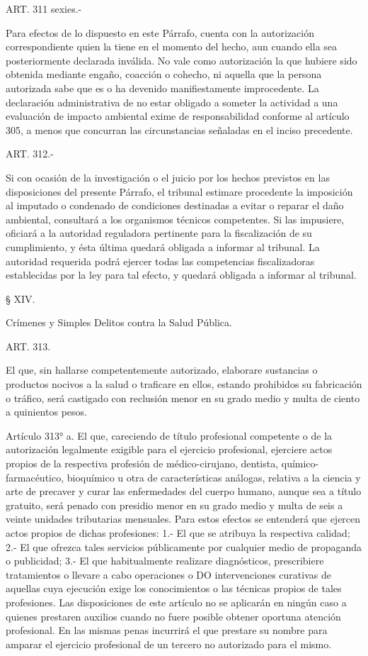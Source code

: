     ART. 311 sexies.-

    Para efectos de lo dispuesto en este Párrafo, cuenta con la autorización correspondiente quien la tiene en el momento del hecho, aun cuando ella sea posteriormente declarada inválida.
    No vale como autorización la que hubiere sido obtenida mediante engaño, coacción o cohecho, ni aquella que la persona autorizada sabe que es o ha devenido manifiestamente improcedente.
    La declaración administrativa de no estar obligado a someter la actividad a una evaluación de impacto ambiental exime de responsabilidad conforme al artículo 305, a menos que concurran las circunstancias señaladas en el inciso precedente.


    ART. 312.-

    Si con ocasión de la investigación o el juicio por los hechos previstos en las disposiciones del presente Párrafo, el tribunal estimare procedente la imposición al imputado o condenado de condiciones destinadas a evitar o reparar el daño ambiental, consultará a los organismos técnicos competentes. Si las impusiere, oficiará a la autoridad reguladora pertinente para la fiscalización de su cumplimiento, y ésta última quedará obligada a informar al tribunal. La autoridad requerida podrá ejercer todas las competencias fiscalizadoras establecidas por la ley para tal efecto, y quedará obligada a informar al tribunal.

    § XIV.

    Crímenes y Simples Delitos contra la Salud Pública.


    ART. 313.

    El que, sin hallarse competentemente autorizado, elaborare sustancias o productos nocivos a la salud o traficare en ellos, estando prohibidos su fabricación o tráfico, será castigado con reclusión menor en su grado medio y multa de ciento a quinientos pesos.


    Artículo 313° a. El que, careciendo de título profesional competente o de la autorización legalmente exigible para el ejercicio profesional, ejerciere actos propios de la respectiva profesión de médico-cirujano, dentista, químico-farmacéutico, bioquímico u otra de características análogas, relativa a la ciencia y arte de precaver y curar las enfermedades del cuerpo humano, aunque sea a título gratuito, será penado con presidio menor en su grado medio y multa de seis a veinte unidades tributarias mensuales.
    Para estos efectos se entenderá que ejercen actos propios de dichas profesiones:
    1.- El que se atribuya la respectiva calidad;
    2.- El que ofrezca tales servicios públicamente por cualquier medio de propaganda o publicidad;
    3.- El que habitualmente realizare diagnósticos, prescribiere tratamientos o llevare a cabo operaciones o DO intervenciones curativas de aquellas cuya ejecución exige los conocimientos o las técnicas propios de tales profesiones.
    Las disposiciones de este artículo no se aplicarán en ningún caso a quienes prestaren auxilios cuando no fuere posible obtener oportuna atención profesional.
    En las mismas penas incurrirá el que prestare su nombre para amparar el ejercicio profesional de un tercero no autorizado para el mismo.



